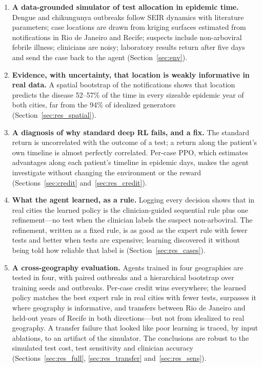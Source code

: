 \documentclass[11pt,a4paper]{article}
\begin{document}
\begin{enumerate}
    \item \textbf{A data-grounded simulator of test allocation in epidemic time.} Dengue and chikungunya outbreaks follow SEIR dynamics with literature parameters; case locations are drawn from kriging surfaces estimated from notifications in Rio de Janeiro and Recife; suspects include non-arboviral febrile illness; clinicians are noisy; laboratory results return after five days and send the case back to the agent (Section~\ref{sec:env}).
    \item \textbf{Evidence, with uncertainty, that location is weakly informative in real data.} A spatial bootstrap of the notifications shows that location predicts the disease 52--57\% of the time in every sizeable epidemic year of both cities, far from the 94\% of idealized generators (Section~\ref{sec:res_spatial}).
    \item \textbf{A diagnosis of why standard deep RL fails, and a fix.} The standard return is uncorrelated with the outcome of a test; a return along the patient's own timeline is almost perfectly correlated. Per-case PPO, which estimates advantages along each patient's timeline in epidemic days, makes the agent investigate without changing the environment or the reward (Sections~\ref{sec:credit} and~\ref{sec:res_credit}).
    \item \textbf{What the agent learned, as a rule.} Logging every decision shows that in real cities the learned policy is the clinician-guided sequential rule plus one refinement---no test when the clinician labels the suspect non-arboviral. The refinement, written as a fixed rule, is as good as the expert rule with fewer tests and better when tests are expensive; learning discovered it without being told how reliable that label is (Section~\ref{sec:res_cases}).
    \item \textbf{A cross-geography evaluation.} Agents trained in four geographies are tested in four, with paired outbreaks and a hierarchical bootstrap over training seeds and outbreaks. Per-case credit wins everywhere; the learned policy matches the best expert rule in real cities with fewer tests, surpasses it where geography is informative, and transfers between Rio de Janeiro and held-out years of Recife in both directions---but not from idealized to real geography. A transfer failure that looked like poor learning is traced, by input ablations, to an artifact of the simulator. The conclusions are robust to the simulated test cost, test sensitivity and clinician accuracy (Sections~\ref{sec:res_full}, \ref{sec:res_transfer} and~\ref{sec:res_sens}).
\end{enumerate}
\end{document}
